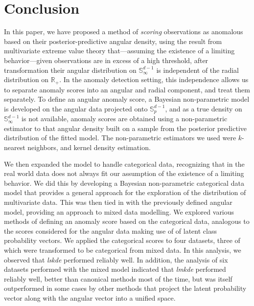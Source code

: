 \section{Conclusion\label{sec:conclusion}}
In this paper, we have proposed a method of \emph{scoring} observations as 
    anomalous based on their posterior-predictive angular density, using the 
    result from multivariate extreme value theory that---assuming the existence 
    of a limiting behavior---given observations are in excess of a high 
    threshold, after transformation their angular distribution on 
    $\mathbb{S}_{\infty}^{d-1}$ is independent of the radial distribution on 
    $\mathbb{R}_+$.  In the anomaly detection setting, this independence allows
    us to separate anomaly scores into an angular and radial component, and
    treat them separately.  To define an angular anomaly score, a Bayesian 
    non-parametric model is developed on the angular data projected onto 
    $\mathbb{S}_p^{d-1}$, and as a true density on $\mathbb{S}_{\infty}^{d-1}$ 
    is not available, anomaly scores are obtained using a non-parametric 
    estimator to that angular density built on a sample from the posterior 
    predictive distribution of the fitted model.  The non-parametric estimators 
    we used were $k$-nearest neighbors, and kernel density estimation.

We then expanded the model to handle categorical data, recognizing that in the 
    real world data does not always fit our assumption of the existence of a 
    limiting behavior.  We did this by developing a Bayesian non-parametric 
    categorical data model that provides a general approach for the exploration
    of the distribution of multivariate data. This was then tied in with the previously 
    defined angular model, providing an approach to mixed data modelling.  We explored 
    various methods of defining an anomaly score based on the categorical 
    data, analogous to the scores considered for the angular data making use of
    of latent class probability vectors. We applied the 
    categorical scores to four datasets, three of which were transformed to be 
    categorical from mixed data.  In this analysis, we observed that 
    \emph{lskde} performed reliably well.
In addition, the analysis of six datasets performed with the mixed model
    indicated that \emph{lmkde} performed reliably well, better than canonical 
    methods most of the time, but was itself outperformed in some cases by other 
    methods that project the latent probability vector along with the angular 
    vector into a unified space.

